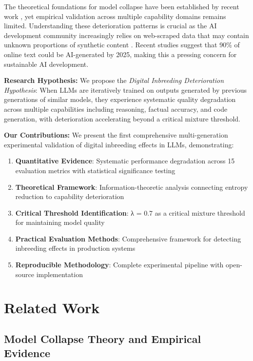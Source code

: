 \documentclass{article}
\begin{document}
The theoretical foundations for model collapse have been established by recent work \citep{shumailov2023curse,alemohammad2023self}, yet empirical validation across multiple capability domains remains limited. Understanding these deterioration patterns is crucial as the AI development community increasingly relies on web-scraped data that may contain unknown proportions of synthetic content \citep{gao2020pile}. Recent studies suggest that 90\% of online text could be AI-generated by 2025, making this a pressing concern for sustainable AI development.

\textbf{Research Hypothesis:} We propose the \textit{Digital Inbreeding Deterioration Hypothesis}: When LLMs are iteratively trained on outputs generated by previous generations of similar models, they experience systematic quality degradation across multiple capabilities including reasoning, factual accuracy, and code generation, with deterioration accelerating beyond a critical mixture threshold.

\textbf{Our Contributions:} We present the first comprehensive multi-generation experimental validation of digital inbreeding effects in LLMs, demonstrating:
\begin{enumerate}
\item \textbf{Quantitative Evidence}: Systematic performance degradation across 15 evaluation metrics with statistical significance testing
\item \textbf{Theoretical Framework}: Information-theoretic analysis connecting entropy reduction to capability deterioration  
\item \textbf{Critical Threshold Identification}: λ = 0.7 as a critical mixture threshold for maintaining model quality
\item \textbf{Practical Evaluation Methods}: Comprehensive framework for detecting inbreeding effects in production systems
\item \textbf{Reproducible Methodology}: Complete experimental pipeline with open-source implementation
\end{enumerate}

\section{Related Work}

\subsection{Model Collapse Theory and Empirical Evidence}
\end{document}

